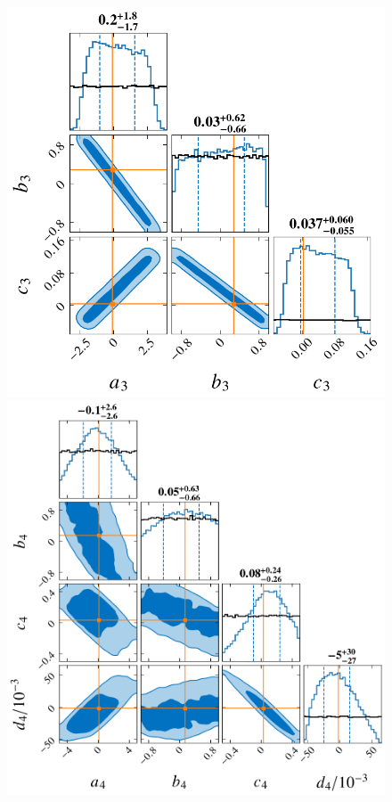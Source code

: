 \documentclass[a4paper,11pt]{article}
\begin{document}
\begin{figure}
    \begin{minipage}[t]{0.49\textwidth}
    \centering
    \includegraphics[width=0.8\linewidth]{Hyper_parameter_3d.png}%
    \end{minipage}
    \hfill
    \begin{minipage}[t]{0.49\textwidth}
    \centering
    \includegraphics[width=0.8\linewidth]{Hyper_parameter_4d.png}
    \end{minipage}
    \vspace{3mm}

\end{figure}
\end{document}
